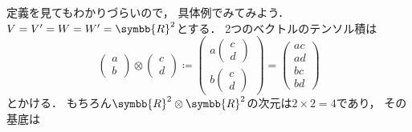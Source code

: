 \documentclass[../sotsu.tex]{subfiles}
\begin{document}
定義を見てもわかりづらいので，
具体例でみてみよう．
$V = V' = W = W' = \symbb{R}^2$とする．
2つのベクトルのテンソル積は
\begin{equation}
    \label{eq:tensor-product-of-2-vector}
    \begin{pmatrix}
        a \\ b
    \end{pmatrix}
    \otimes
    \begin{pmatrix}
        c \\ d
    \end{pmatrix}
    \coloneq
    \begin{pmatrix}
        a 
        \begin{pmatrix}
            c \\ d
        \end{pmatrix}
        \\
        b
        \begin{pmatrix}
            c \\ d
        \end{pmatrix}
    \end{pmatrix}
    =
    \begin{pmatrix}
        ac \\ ad \\ bc \\ bd
    \end{pmatrix}
\end{equation}
とかける．
もちろん$\symbb{R}^2 \otimes \symbb{R}^2$の次元は$2 \times 2 = 4$であり，
その基底は
\end{document}
